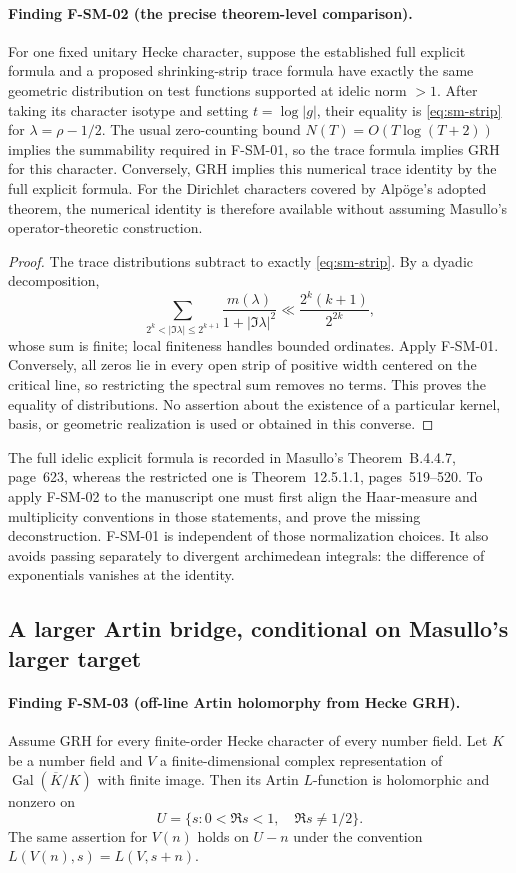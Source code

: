 \documentclass[11pt,a4paper]{article}
\theoremstyle{definition}\newtheorem{definition}[theorem]{Definition}
\theoremstyle{remark}\newtheorem{remark}[theorem]{Remark}
\begin{document}
\paragraph{Finding F-SM-02 (the precise theorem-level comparison).}
For one fixed unitary Hecke character, suppose the established full explicit formula
and a proposed shrinking-strip trace formula have exactly the same
geometric distribution on test functions supported at idelic norm $>1$.
After taking its character isotype and setting $t=\log|g|$, their equality
is \eqref{eq:sm-strip} for $\lambda=\rho-1/2$.  The usual zero-counting
bound $N(T)=O(T\log(T+2))$ implies the summability required in
F-SM-01, so the trace formula implies GRH for this character.  Conversely,
GRH implies this numerical trace identity by the full explicit formula.
For the Dirichlet characters covered by Alp\"oge's adopted theorem, the
numerical identity is therefore available without assuming Masullo's
operator-theoretic construction.

\begin{proof}
The trace distributions subtract to exactly \eqref{eq:sm-strip}.  By a
dyadic decomposition,
\[
 \sum_{2^k<|\Im\lambda|\leq2^{k+1}}
 \frac{m(\lambda)}{1+|\Im\lambda|^2}
 \ll \frac{2^k(k+1)}{2^{2k}},
\]
whose sum is finite; local finiteness handles bounded ordinates.
Apply F-SM-01.  Conversely, all zeros lie in every open strip of positive
width centered on the critical line, so restricting the spectral sum removes
no terms.  This proves the equality of distributions.  No assertion about
the existence of a particular kernel, basis, or geometric realization is
used or obtained in this converse.
\end{proof}

The full idelic explicit formula is recorded in Masullo's Theorem~B.4.4.7,
page~623, whereas the restricted one is Theorem~12.5.1.1,
pages~519--520.  To apply F-SM-02 to the manuscript one must first align the
Haar-measure and multiplicity conventions in those statements, and prove
the missing deconstruction.  F-SM-01 is independent of those normalization
choices.  It also avoids passing separately to divergent archimedean
integrals: the difference of exponentials vanishes at the identity.

\subsection{A larger Artin bridge, conditional on Masullo's larger target}

\paragraph{Finding F-SM-03 (off-line Artin holomorphy from Hecke GRH).}
Assume GRH for every finite-order Hecke character of every number field.
Let $K$ be a number field and $V$ a finite-dimensional complex
representation of $\operatorname{Gal}(\overline K/K)$ with finite image.
Then its Artin $L$-function is holomorphic and nonzero on
\[
 U=\{s:0<\Re s<1,\quad\Re s\ne1/2\}.
\]
The same assertion for $V(n)$ holds on $U-n$ under the convention
$L(V(n),s)=L(V,s+n)$.
\end{document}
